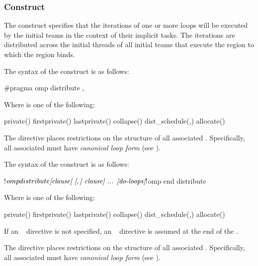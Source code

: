 \subsubsection{ Construct}
\label{subsec:distribute Construct}
\summary
The  construct specifies that the iterations of one or 
more loops will be executed by the initial teams in the context of their 
implicit tasks. The iterations are distributed across the initial threads 
of all initial teams that execute the  region to which the 
 region binds.

\syntax
\begin{ccppspecific}
The syntax of the  construct is as follows:

\begin{ompcPragma}
#pragma omp distribute \plc{[clause[ [},\plc{] clause] ... ] new-line}
\end{ompcPragma}

Where  is one of the following:

\begin{indentedcodelist}
private()
firstprivate()
lastprivate()
collapse()
dist_schedule(\plc{kind[},\plc{ chunk_size]})
allocate(\plc{[allocator: ]})
\end{indentedcodelist}

The  directive places restrictions on the structure of all
associated .  Specifically, all associated  must
have \emph{canonical loop form} (see ).
\end{ccppspecific}


\begin{fortranspecific}
The syntax of the  construct is as follows:

\begin{ompfPragma}
!$omp distribute \plc{[clause[ [},\plc{] clause] ... ]}
   \plc{do-loops}
\plc{[}!$omp end distribute\plc{]}
\end{ompfPragma}

Where  is one of the following:

\begin{indentedcodelist}
private()
firstprivate()
lastprivate()
collapse()
dist_schedule(\plc{kind[},\plc{ chunk_size]})
allocate(\plc{[allocator: ]})
\end{indentedcodelist}

If an ~ directive is not specified, an 
~ directive is assumed at the end of the .

The  directive places restrictions on the structure of all
associated .  Specifically, all associated  must
have \emph{canonical loop form} (see ).
\end{fortranspecific}

